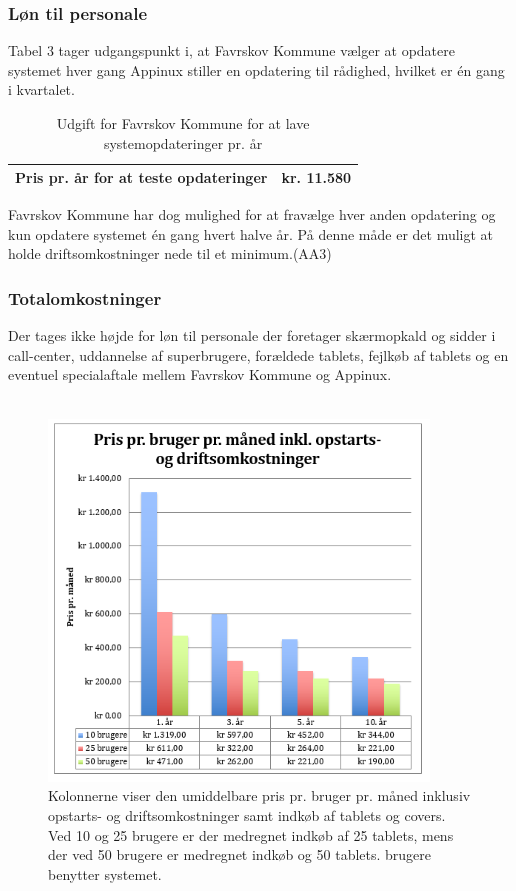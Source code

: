 \subsubsection{Løn til personale}
Tabel 3 tager udgangspunkt i, at Favrskov Kommune vælger at opdatere systemet hver gang Appinux stiller en opdatering til rådighed, hvilket er én gang i kvartalet. 

\begin{table}[H]
	\caption{Udgift for Favrskov Kommune for at lave systemopdateringer pr. år}
	\centering
	\label{tab:tabelpersonaleudgift}
	\begin{tabularx}{\textwidth}{|X|X|}
		\hline
		Pris pr. år for at teste opdateringer
		& kr. 11.580\\ 
		\hline
	\end{tabularx}
\end{table}
Favrskov Kommune har dog mulighed for at fravælge hver anden opdatering og kun opdatere systemet én gang hvert halve år. På denne måde er det muligt at holde driftsomkostninger nede til et minimum.(AA3) 
\subsubsection{Totalomkostninger}
Der tages ikke højde for løn til personale der foretager skærmopkald og sidder i call-center, uddannelse af superbrugere, forældede tablets, fejlkøb af tablets og en eventuel specialaftale mellem Favrskov Kommune og Appinux.\\ \\

\begin{figure}[H]
	\centering
	\includegraphics[width=0.9\textwidth]{Figurer/figuroko.png}
	\caption{\label{fig:oekokort}Kolonnerne viser den umiddelbare pris pr. bruger pr. måned inklusiv opstarts- og driftsomkostninger samt indkøb af tablets og covers.
		Ved 10 og 25 brugere er der medregnet indkøb af 25 tablets, mens der ved 50 brugere er medregnet indkøb og 50 tablets. brugere benytter systemet.}
\end{figure}

